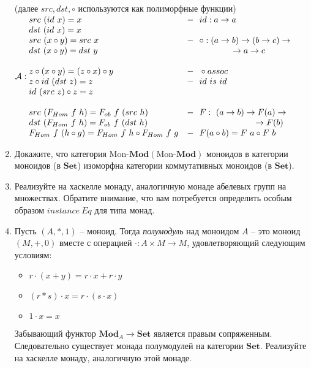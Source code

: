 \documentclass[draft]{article}
\newcommand{\cat}[1]{\mathbf{#1}}
\newcommand{\Set}{\cat{Set}}
\newcommand{\fs}[1]{\mathrm{#1}}
\newcommand{\Mod}[1]{#1\text{-}\cat{Mod}}
\begin{document}
\begin{enumerate}
(далее $src, dst, \circ$ используются как полиморфные функции)\\
$
\mathcal{A}:\\
\begin{matrix*}[l]
src~(id~x) = x & -~~ id: a \to a\\
dst~(id~x) = x\\
src~(x \circ y) = src ~x & -~~\circ: (a \to b) \to (b \to c) \to\\
dst~(x \circ y) = dst ~y& ~~~~~~~~~~~~~~~~\to a \to c\\\\
z\circ (x \circ y) = (z\circ x) \circ y &-~~\circ assoc\\
z\circ id ~(dst ~z) = z & -~~id ~is~ id\\
id~(src ~z) \circ z  = z\\\\
src~(F_{Hom}~f~h) = F_{ob}~f~(src~h)&-~~F:~(a\to b)\to F(a)\to\\
dst~(F_{Hom}~f~h) = F_{ob}~f~(dst~h)&~~~~~~~~~~~~~~~~~~~~~~~~ \to F(b)\\
F_{Hom}~f~(h\circ g) = F_{Hom}~f~h\circ F_{Hom}~f~g&-~~F(a\circ b) = F~a\circ F~b\\
\end{matrix*}
$


\item Докажите, что категория $\Mod{\fs{Mon}}(\Mod{\fs{Mon}})$ моноидов в категории моноидов (в $\Set$) изоморфна категории коммутативных моноидов (в $\Set$).

\item Реализуйте на хаскелле монаду, аналогичную монаде абелевых групп на множествах.
Обратите внимание, что вам потребуется определить особым образом $\mathit{instance}\ \mathit{Eq}$ для типа монад.

\item Пусть $(A,*,1)$ -- моноид.
Тогда \emph{полумодуль} над моноидом $A$ -- это моноид $(M,+,0)$ вместе с операцией $\cdot : A \times M \to M$, удовлетворяющий следующим условиям:
\begin{itemize}
\item $r \cdot (x + y) = r \cdot x + r \cdot y$
\item $(r * s) \cdot x = r \cdot (s \cdot x)$
\item $1 \cdot x = x$
\end{itemize}
Забывающий функтор $\cat{Mod}_A \to \Set$ является правым сопряженным.
Следовательно существует монада полумодулей на категории $\Set$.
Реализуйте на хаскелле монаду, аналогичную этой монаде.


\end{enumerate}
\end{document}
